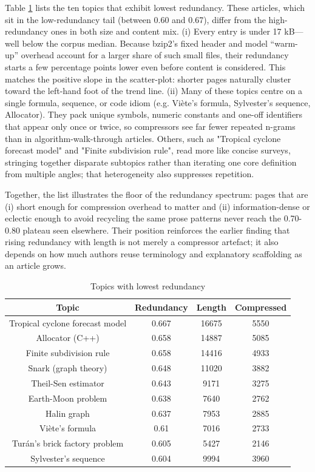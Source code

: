 Table \ref{tab:Lower-redundancy-of-topics} lists the ten topics that exhibit lowest redundancy. These articles, which sit in the low-redundancy tail (between 0.60 and 0.67), differ from the high-redundancy ones in both size and content mix. (i)  Every entry is under 17 kB—well below the corpus median. Because bzip2's fixed header and model “warm-up” overhead account for a larger share of such small files, their redundancy starts a few percentage points lower even before content is considered. This matches the positive slope in the scatter-plot: shorter pages naturally cluster toward the left-hand foot of the trend line. (ii) Many of these topics centre on a single formula, sequence, or code idiom (e.g. Viète's formula, Sylvester's sequence, Allocator). They pack unique symbols, numeric constants and one-off identifiers that appear only once or twice, so compressors see far fewer repeated n-grams than in algorithm-walk-through articles. Others, such as "Tropical cyclone forecast model" and "Finite subdivision rule", read more like concise surveys, stringing together disparate subtopics rather than iterating one core definition from multiple angles; that heterogeneity also suppresses repetition.

Together, the list illustrates the floor of the redundancy spectrum: pages that are (i) short enough for compression overhead to matter and (ii) information-dense or eclectic enough to avoid recycling the same prose patterns never reach the 0.70-0.80 plateau seen elsewhere.  Their position reinforces the earlier finding that rising redundancy with length is not merely a compressor artefact; it also depends on how much authors reuse terminology and explanatory scaffolding as an article grows.

\begin{table}
\begin{centering}
\begin{tabular}{|c|c|c|c|}
\hline 
Topic & Redundancy & Length & Compressed \tabularnewline
\hline 
\hline 
Tropical cyclone forecast model & 0.667 & 16675 & 5550 \tabularnewline
\hline
Allocator (C++) & 0.658 & 14887 & 5085 \tabularnewline
\hline
Finite subdivision rule & 0.658 & 14416 & 4933 \tabularnewline
\hline
Snark (graph theory) & 0.648 & 11020 & 3882 \tabularnewline
\hline
Theil-Sen estimator & 0.643 & 9171 & 3275 \tabularnewline
\hline
Earth-Moon problem & 0.638 & 7640 & 2762 \tabularnewline
\hline
Halin graph & 0.637 & 7953 & 2885 \tabularnewline
\hline
Viète's formula & 0.61 & 7016 & 2733 \tabularnewline
\hline
Turán's brick factory problem & 0.605 & 5427 & 2146 \tabularnewline
\hline
Sylvester's sequence & 0.604 & 9994 & 3960 \tabularnewline
\hline 
\end{tabular}
\par\end{centering}
\caption{\label{tab:Lower-redundancy-of-topics}Topics with lowest redundancy}
\end{table}

